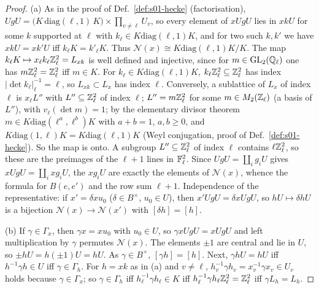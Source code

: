 \begin{proof}
(a) As in the proof of Def.~\ref{def:s01-hecke} (factorisation), $UgU=\big(K\,\mathrm{diag}(\ell,1)\,K\big)\times\prod_{v\ne\ell}U_v$, so every element of
$xUgU$ lies in $xkU$ for some $k$ supported at $\ell$ with $k_\ell\in K\mathrm{diag}(\ell,1)K$, and for two such $k,k'$ we have $xkU=xk'U$ iff
$k_\ell K=k'_\ell K$. Thus $\mathcal N(x)\cong K\mathrm{diag}(\ell,1)K/K$. The map $k_\ell K\mapsto x_\ell k_\ell\mathbb{Z}_\ell^2=L_{xk}$ is well defined and
injective, since for $m\in\mathrm{GL}_2(\mathbb{Q}_\ell)$ one has $m\mathbb{Z}_\ell^2=\mathbb{Z}_\ell^2$ iff $m\in K$. For $k_\ell\in K\mathrm{diag}(\ell,1)K$, $k_\ell\mathbb{Z}_\ell^2\subseteq\mathbb{Z}_\ell^2$ has index
$|\det k_\ell|_\ell^{-1}=\ell$, so $L_{xk}\subset L_x$ has index $\ell$. Conversely, a sublattice of $L_x$ of index $\ell$ is $x_\ell L''$ with
$L''\subseteq\mathbb{Z}_\ell^2$ of index $\ell$; $L''=m\mathbb{Z}_\ell^2$ for some $m\in M_2(\mathbb{Z}_\ell)$ (a basis of $L''$), with $v_\ell(\det m)=1$; by the
elementary divisor theorem $m\in K\mathrm{diag}(\ell^a,\ell^b)K$ with $a+b=1$, $a,b\ge0$, and $K\mathrm{diag}(1,\ell)K=K\mathrm{diag}(\ell,1)K$ (Weyl
conjugation, proof of Def.~\ref{def:s01-hecke}). So the map is onto. A subgroup $L''\subseteq\mathbb{Z}_\ell^2$ of index $\ell$ contains $\ell\mathbb{Z}_\ell^2$, so these are
the preimages of the $\ell+1$ lines in $\mathbb{F}_\ell^2$. Since $UgU=\coprod_ig_iU$ gives $xUgU=\coprod_ixg_iU$, the $xg_iU$ are exactly the elements of
$\mathcal N(x)$, whence the formula for $B(e,e')$ and the row sum $\ell+1$. Independence of the representative: if $x'=\delta xu_0$ ($\delta\in B^\times$,
$u_0\in U$), then $x'UgU=\delta xUgU$, so $hU\mapsto\delta hU$ is a bijection $\mathcal N(x)\to\mathcal N(x')$ with $[\delta h]=[h]$.

(b) If $\gamma\in\Gamma_x$, then $\gamma x=xu_0$ with $u_0\in U$, so $\gamma xUgU=xUgU$ and left multiplication by $\gamma$ permutes $\mathcal N(x)$. The
elements $\pm1$ are central and lie in $U$, so $\pm hU=h(\pm1)U=hU$. As $\gamma\in B^\times$, $[\gamma h]=[h]$. Next, $\gamma hU=hU$ iff
$h^{-1}\gamma h\in U$ iff $\gamma\in\Gamma_h$. For $h=xk$ as in (a) and $v\ne\ell$, $h_v^{-1}\gamma h_v=x_v^{-1}\gamma x_v\in U_v$ holds because
$\gamma\in\Gamma_x$; so $\gamma\in\Gamma_h$ iff $h_\ell^{-1}\gamma h_\ell\in K$ iff $h_\ell^{-1}\gamma h_\ell\mathbb{Z}_\ell^2=\mathbb{Z}_\ell^2$ iff $\gamma L_h=L_h$.
\end{proof}

